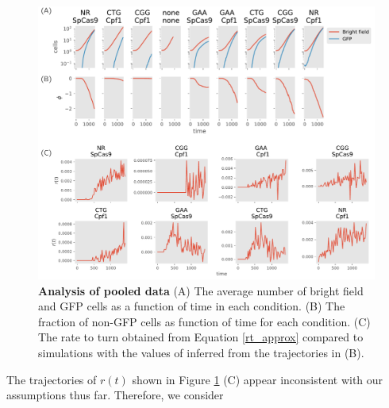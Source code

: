 \documentclass{article}
\begin{document}
\begin{figure}[h!]
\centering
\includegraphics[scale=0.6]{fig1.pdf}
\caption{{\bf Analysis of pooled data} (A) The average number of bright field and GFP cells as a function of time in each condition.  (B) The fraction of non-GFP cells as function of time for each condition.  (C) The rate to turn obtained from Equation \ref{rt_approx} compared to simulations with the values of inferred from the trajectories in (B). }\label{fig:1}
\end{figure}






The trajectories of $r(t)$ shown in Figure \ref{fig:1} (C) appear inconsistent with our assumptions thus far. Therefore, we consider 
\end{document}
